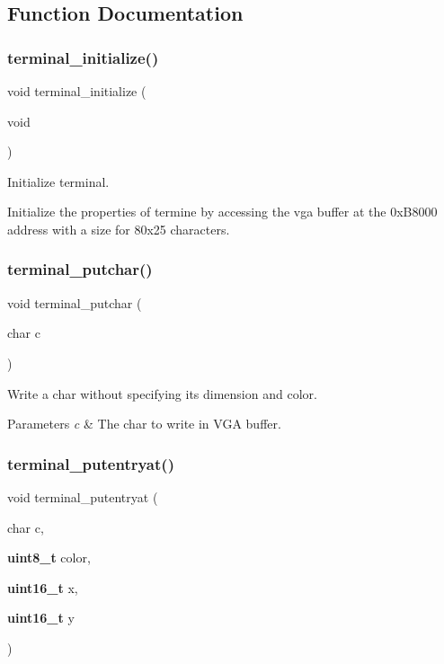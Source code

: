 \subsection{Function Documentation}
\mbox{\label{kernel_8c_ac4802010a838e2e4909fe47fc7edbe3e}} 
\subsubsection{terminal\+\_\+initialize()}
{\footnotesize\ttfamily void terminal\+\_\+initialize (\begin{DoxyParamCaption}\item[{void}]{ }\end{DoxyParamCaption})}



Initialize terminal. 

Initialize the properties of termine by accessing the vga buffer at the 0x\+B8000 address with a size for 80x25 characters. \mbox{\label{kernel_8c_a0e77ef8710654966af44f69becffcd80}} 
\subsubsection{terminal\+\_\+putchar()}
{\footnotesize\ttfamily void terminal\+\_\+putchar (\begin{DoxyParamCaption}\item[{char}]{c }\end{DoxyParamCaption})}



Write a char without specifying its dimension and color. 


\begin{DoxyParams}{Parameters}
{\em c} & The char to write in V\+GA buffer. \\
\hline
\end{DoxyParams}
\mbox{\label{kernel_8c_a6df85b4463bee56146ea4e16c13d6708}} 
\subsubsection{terminal\+\_\+putentryat()}
{\footnotesize\ttfamily void terminal\+\_\+putentryat (\begin{DoxyParamCaption}\item[{char}]{c,  }\item[{\textbf{ uint8\+\_\+t}}]{color,  }\item[{\textbf{ uint16\+\_\+t}}]{x,  }\item[{\textbf{ uint16\+\_\+t}}]{y }\end{DoxyParamCaption})}



